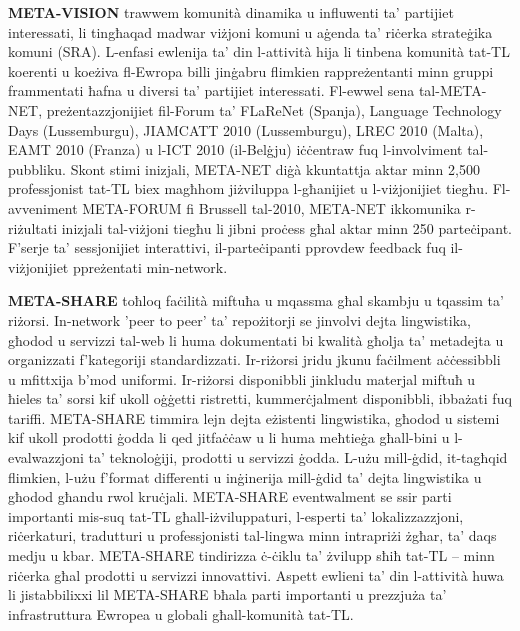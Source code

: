 \documentclass[]{../../metanetpaper}
\begin{document}
\begin{multicols}{2}
\textbf{META-VISION} trawwem komunità dinamika u influwenti ta’ partijiet interessati, li tingħaqad madwar viżjoni komuni u aġenda ta’ riċerka strateġika komuni (SRA). L-enfasi ewlenija ta’ din l-attività hija li tinbena komunità tat-TL koerenti u koeżiva fl-Ewropa billi jinġabru flimkien rappreżentanti minn gruppi frammentati ħafna u diversi ta' partijiet interessati. Fl-ewwel sena tal-META-NET, preżentazzjonijiet fil-Forum ta’ FLaReNet (Spanja), Language Technology Days (Lussemburgu), JIAMCATT 2010 (Lussemburgu), LREC 2010 (Malta), EAMT 2010 (Franza) u l-ICT 2010 (il-Belġju) iċċentraw fuq l-involviment tal-pubbliku. Skont stimi inizjali, META-NET diġà kkuntattja aktar minn 2,500 professjonist tat-TL biex magħhom jiżviluppa l-għanijiet u l-viżjonijiet tiegħu. Fl-avveniment META-FORUM fi Brussell tal-2010, META-NET ikkomunika r-riżultati inizjali tal-viżjoni tiegħu li jibni proċess għal aktar minn 250 parteċipant. F’serje ta’ sessjonijiet interattivi, il-parteċipanti pprovdew feedback fuq il-viżjonijiet ppreżentati min-network.

\textbf{META-SHARE} toħloq faċilità miftuħa u mqassma għal skambju u tqassim ta’ riżorsi. In-network 'peer to peer' ta’ repożitorji se jinvolvi dejta lingwistika, għodod u servizzi tal-web li huma dokumentati bi kwalità għolja ta’ metadejta u organizzati f’kategoriji standardizzati. Ir-riżorsi jridu jkunu faċilment aċċessibbli u mfittxija b’mod uniformi. Ir-riżorsi disponibbli jinkludu materjal miftuħ u ħieles ta’ sorsi kif ukoll oġġetti ristretti, kummerċjalment disponibbli, ibbażati fuq tariffi. META-SHARE timmira lejn dejta eżistenti lingwistika, għodod u sistemi kif ukoll prodotti ġodda li qed jitfaċċaw u li huma meħtieġa għall-bini u l-evalwazzjoni ta’ teknoloġiji, prodotti u servizzi ġodda. L-użu mill-ġdid, it-tagħqid flimkien, l-użu f’format differenti u inġinerija mill-ġdid ta’ dejta lingwistika u għodod għandu rwol kruċjali. META-SHARE eventwalment se ssir parti importanti mis-suq tat-TL għall-iżviluppaturi, l-esperti ta’ lokalizzazzjoni, riċerkaturi, tradutturi u professjonisti tal-lingwa minn intrapriżi żgħar, ta’ daqs medju u kbar. META-SHARE tindirizza ċ-ċiklu ta’ żvilupp sħiħ tat-TL – minn riċerka għal prodotti u servizzi innovattivi. Aspett ewlieni ta’ din l-attività huwa li jistabbilixxi lil META-SHARE bħala parti importanti u prezzjuża ta’ infrastruttura Ewropea u globali għall-komunità tat-TL.


\end{multicols}
\end{document}
